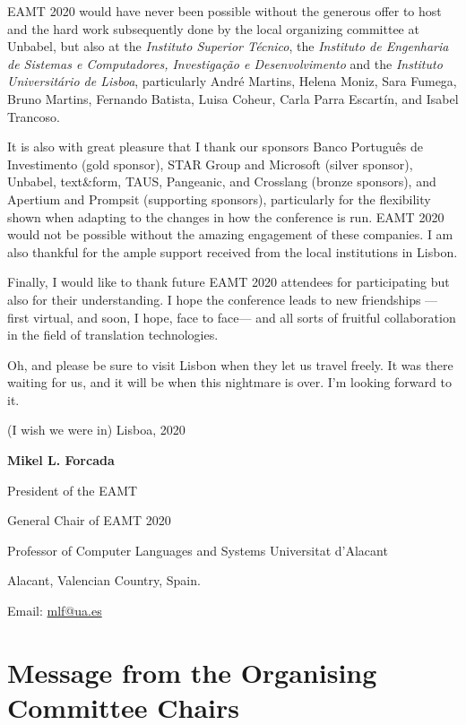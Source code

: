 \documentclass[a4paper,11pt,twoside]{book}
\begin{document}
EAMT 2020 would have never been possible without the generous offer to host and the
hard work subsequently done by the local organizing committee at Unbabel, but also at the \emph{Instituto Superior Técnico}, the \emph{Instituto de Engenharia de Sistemas e Computadores, Investigação e Desenvolvimento} and the \emph{Instituto Universitário de Lisboa}, particularly André Martins, Helena Moniz, Sara Fumega, Bruno Martins, Fernando Batista, Luisa Coheur, Carla Parra Escartín, and Isabel Trancoso.

It is also with great pleasure that I thank our sponsors Banco Português de Investimento (gold sponsor), STAR Group and Microsoft (silver sponsor), Unbabel, text\&form, TAUS, Pangeanic, and Crosslang (bronze sponsors), and Apertium and Prompsit (supporting sponsors), particularly for the flexibility shown when adapting to the changes in how the conference is run. EAMT 2020 would not be possible without the amazing engagement of these companies. I am also thankful for the ample support received from the local institutions in Lisbon. 

Finally, I would like to thank future EAMT 2020 attendees for participating but also for their understanding. I hope
the conference leads to new friendships ---first virtual, and soon, I hope, face to face--- and all sorts of fruitful collaboration in the field of translation technologies. 

Oh, and please be sure to visit Lisbon when they let us travel freely. It was there waiting for us, and it will be when this nightmare is over. I'm looking forward to it.

\vspace{1cm}

\noindent (I wish we were in) Lisboa, 2020

\vspace{1cm}

\noindent \textbf{Mikel L. Forcada}

\noindent President of the EAMT

\noindent General Chair of EAMT 2020

\noindent Professor of Computer Languages and Systems
\noindent Universitat d'Alacant

\noindent Alacant, Valencian Country, Spain.

\noindent Email: \url{mlf@ua.es}


\chapter*{Message from the Organising Committee Chairs}
\end{document}
